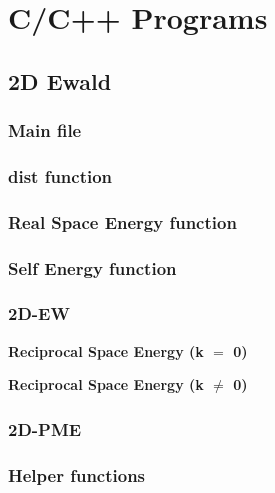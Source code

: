 \chapter{C/C++ Programs}
\label{AppendixB} %

\section{2D Ewald}
    \subsection{Main file}
    
    
    \subsection{dist function}
    
    
    \subsection{Real Space Energy function}
    
    
    \subsection{Self Energy function}
    
    
    \subsection{2D-EW}
    \textbf{Reciprocal Space Energy (k $=$ 0)}
    
    
    \textbf{Reciprocal Space Energy (k $\neq$ 0)}
    
    
    \subsection{2D-PME}
    
    
    \subsection{Helper functions}
    
    
